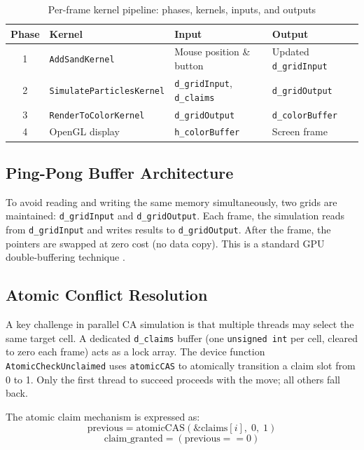 \documentclass[12pt,a4paper]{article}
\begin{document}
    \begin{table}[h]
    \centering
    \begin{tabular}{|c|l|l|l|}
    \hline
    \textbf{Phase} & \textbf{Kernel} & \textbf{Input} & \textbf{Output} \\
    \hline
    1 & \texttt{AddSandKernel} & Mouse position \& button & Updated \texttt{d\_gridInput} \\
    2 & \texttt{SimulateParticlesKernel} & \texttt{d\_gridInput}, \texttt{d\_claims} & \texttt{d\_gridOutput} \\
    3 & \texttt{RenderToColorKernel} & \texttt{d\_gridOutput} & \texttt{d\_colorBuffer} \\
    4 & OpenGL display & \texttt{h\_colorBuffer} & Screen frame \\
    \hline
    \end{tabular}
    \caption{Per-frame kernel pipeline: phases, kernels, inputs, and outputs}
    \label{Table:pipeline}
    \end{table}

	\subsection{Ping-Pong Buffer Architecture}
    To avoid reading and writing the same memory simultaneously, two grids are maintained: 
    \texttt{d\_gridInput} and \texttt{d\_gridOutput}. Each frame, the simulation reads from 
    \texttt{d\_gridInput} and writes results to \texttt{d\_gridOutput}. After the frame, 
    the pointers are swapped at zero cost (no data copy). This is a standard GPU double-buffering 
    technique \cite{sanders2010cuda}.

	\subsection{Atomic Conflict Resolution}
    A key challenge in parallel CA simulation is that multiple threads may select the same target 
    cell. A dedicated \texttt{d\_claims} buffer (one \texttt{unsigned int} per cell, cleared to 
    zero each frame) acts as a lock array. The device function \texttt{AtomicCheckUnclaimed} 
    uses \texttt{atomicCAS} to atomically transition a claim slot from 0 to 1. Only the first 
    thread to succeed proceeds with the move; all others fall back.

    The atomic claim mechanism is expressed as:
    \[
        \text{previous} = \text{atomicCAS}(\&\text{claims}[i], \; 0, \; 1)
    \]
    \[
        \text{claim\_granted} = (\text{previous} == 0)
    \]
\end{document}
